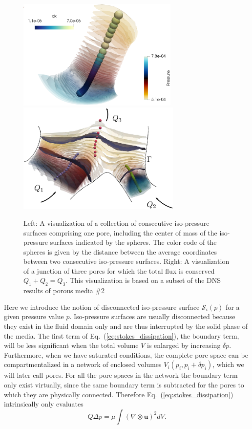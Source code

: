 \documentclass[draft]{agujournal2019}
\begin{document}
\begin{figure}[t!]
\includegraphics[height=5.5cm]{figures/example_pore_v2.eps}
\includegraphics[height=5.5cm]{figures/merging_pores_v2.eps}
\caption{Left: A visualization of a collection of consecutive iso-pressure surfaces comprising one pore, including the center of mass of the iso-pressure surfaces indicated by the spheres. The color code of the spheres is given by the distance between the average coordinates between two consecutive iso-pressure surfaces. Right: A visualization of a junction of three pores for which the total flux is conserved $Q_1+Q_2 = Q_3$. This visualization is based on a subset of the DNS results of porous media \#2}
\label{fig:isop_surfaces}
\end{figure}
Here we introduce the notion of disconnected iso-pressure surface $\mathcal{S}_i(p)$ for a given pressure value $p$. Iso-pressure surfaces are usually disconnected because they exist in the fluid domain only and are thus interrupted by the solid phase of the media. The first term of Eq.~(\ref{eq:stokes_dissipation}), the boundary term, will be less significant when the total volume $V$ is enlarged by increasing $\delta p$. Furthermore, when we have saturated conditions, the complete pore space can be compartmentalized in a network of enclosed volumes $V_i(p_i, p_i+\delta p_i )$, which we will later call pores. For all the pore spaces in the network the boundary term only exist virtually, since the same boundary term is subtracted for the pores to which they are physically connected. Therefore Eq.~(\ref{eq:stokes_dissipation}) intrinsically only evaluates
\begin{equation}
Q \Delta p=\mu\int (\nabla \otimes \mathbf{u})^2 dV.\label{eq:pore_based_energy_dissipation}
\end{equation}
\end{document}
